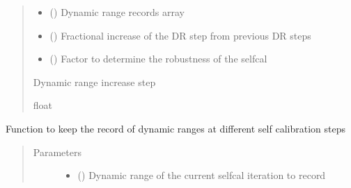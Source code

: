 \documentclass[letterpaper,10pt,english]{sphinxmanual}
\begin{document}
\begin{fulllineitems}
\begin{fulllineitems}
\begin{quote}
\begin{description}
\begin{itemize}
\item {} 
\sphinxAtStartPar
{} () \textendash{} Dynamic range records array

\item {} 
\sphinxAtStartPar
{} () \textendash{} Fractional increase of the DR step from previous DR steps

\item {} 
\sphinxAtStartPar
{} () \textendash{} Factor to determine the robustness of the selfcal

\end{itemize}

\item[{Returns}] \leavevmode
\sphinxAtStartPar
Dynamic range increase step

\item[{Return type}] \leavevmode
\sphinxAtStartPar
float

\end{description}\end{quote}

\end{fulllineitems}


\begin{fulllineitems}
\label{\detokenize{paircars:paircars.intensity_selfcal_LTS.IntensitySelfcal.DR_record}}
\sphinxAtStartPar
Function to keep the record of dynamic ranges at different self calibration steps
\begin{quote}\begin{description}
\item[{Parameters}] \leavevmode\begin{itemize}
\item {} 
\sphinxAtStartPar
{} () \textendash{} Dynamic range of the current selfcal iteration to record


\end{itemize}
\end{description}
\end{quote}
\end{fulllineitems}
\end{fulllineitems}
\end{document}
